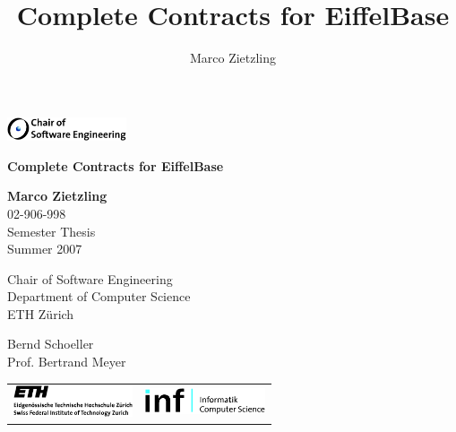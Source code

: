 \documentclass[a4paper,12pt,twoside]{book}
\begin{document}

\title{Complete Contracts for EiffelBase}
\author{Marco Zietzling}

\begin{titlepage}
	\begin{flushleft}
		\includegraphics[width=100pt]{pictures/SE.png}
	\end{flushleft}

	\vskip 50pt
	\begin{center}
		\Huge \textbf{Complete Contracts for EiffelBase}
	\end{center}

	\vskip 100pt
	\begin{flushright}
		\large \textbf{Marco Zietzling}\\
		\vskip 10pt
		02-906-998\\
		Semester Thesis\\
		Summer 2007\\
	\end{flushright}
	
	\vskip 20pt
	\begin{flushright}
		\large Chair of Software Engineering\\
		Department of Computer Science\\
		ETH Z\"{u}rich
	\end{flushright}
		
	\vskip 20pt
	\begin{flushright}
		\large Bernd Schoeller\\
		Prof. Bertrand Meyer
	\end{flushright}

	\vskip 50pt
	\begin{tabular*}{1.00\textwidth}{@{\extracolsep{\fill}}lr}
		 \includegraphics[width=100pt]{pictures/ETH.png} &
		 \includegraphics[width=100pt]{pictures/INF.png}
	\end{tabular*}
	\vfil
\end{titlepage}

\addtolength{\parskip}{0.5\baselineskip} %



\addtolength{\parskip}{-0.5\baselineskip} %
\tableofcontents
\cleardoublepage

\addtolength{\parskip}{0.5\baselineskip} %






\addtolength{\parskip}{-0.5\baselineskip} %



\end{document}
